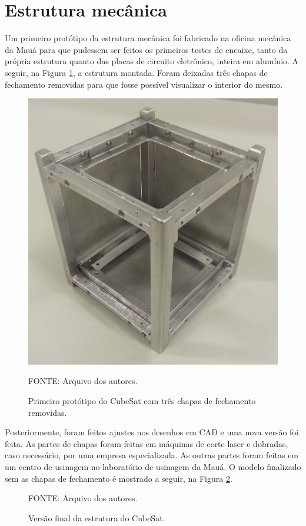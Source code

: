 \documentclass[
	12pt,				%
	openany,			%
	twoside,			%
	a4paper,			%
	english,			%
	french,				%
	spanish,			%
	brazil,				%
	oldfontcommands
	]{abntex2}
\begin{document}
\section{Estrutura mecânica}

Um primeiro protótipo da estrutura mecânica foi fabricado na oficina mecânica da Mauá para que pudessem ser feitos os primeiros testes de encaixe, tanto da própria estrutura quanto das placas de circuito eletrônico, inteira em alumínio. A seguir, na Figura \ref{fig:Protoone}, a estrutura montada. Foram deixadas três chapas de fechamento removidas para que fosse possível visualizar o interior do mesmo.

\begin{figure}[ht]
	\caption{Primeiro protótipo do CubeSat com três chapas de fechamento removidas.}
	\centering
	\includegraphics[width=0.6\linewidth]{./figs/PrototypeOne}
	
	\begin{small}
		FONTE: Arquivo dos autores.
	\end{small}
	\label{fig:Protoone}
\end{figure}


Posteriormente, foram feitos ajustes nos desenhos em CAD e uma nova versão foi feita. As partes de chapas foram feitas em máquinas de corte laser e dobradas, caso necessário, por uma empresa especializada. As outras partes foram feitas em um centro de usinagem no laboratório de usinagem da Mauá. O modelo finalizado sem as chapas de fechamento é mostrado a seguir, na Figura \ref{fig:ProtoTwo}.

\begin{figure}[th]
	\caption{Versão final da estrutura do CubeSat.}
	\centering
	
	\begin{small}
		FONTE: Arquivo dos autores.
	\end{small}
	\label{fig:ProtoTwo}
\end{figure}
\end{document}
